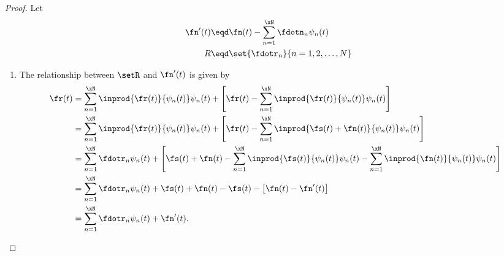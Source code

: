 \begin{proof}
Let
\begin{align*}
  \fn'(t) &\eqd \fn(t) - \sum_{n=1}^\xN \fdotn_n \psi_n(t) \\
  R       &\eqd \set{\fdotr_n}{n=1,2,\ldots,N}
\end{align*}

\begin{enumerate}
\item The relationship between $\setR$ and $\fn'(t)$ is given by
\begin{align*}
   \fr(t)
     &= \sum_{n=1}^\xN \inprod{\fr(t)}{\psi_n(t)}\psi_n(t) +
        \left[\fr(t)- \sum_{n=1}^\xN \inprod{\fr(t)}{\psi_n(t)}\psi_n(t) \right]
   \\&= \sum_{n=1}^\xN \inprod{\fr(t)}{\psi_n(t)}\psi_n(t) +
        \left[\fr(t)- \sum_{n=1}^\xN \inprod{\fs(t)+\fn(t)}{\psi_n(t)}\psi_n(t) \right]
   \\&= \sum_{n=1}^\xN \fdotr_n\psi_n(t) +
        \left[\fs(t)+\fn(t) - \sum_{n=1}^\xN \inprod{\fs(t)}{\psi_n(t)}\psi_n(t)
                        - \sum_{n=1}^\xN \inprod{\fn(t)}{\psi_n(t)}\psi_n(t) \right]
   \\&= \sum_{n=1}^\xN \fdotr_n\psi_n(t) +
        \fs(t)+\fn(t) - \fs(t) - \left[ \fn(t) - \fn'(t)\right]
   \\&= \sum_{n=1}^\xN \fdotr_n\psi_n(t) + \fn'(t).
\end{align*}


\end{enumerate}
\end{proof}
